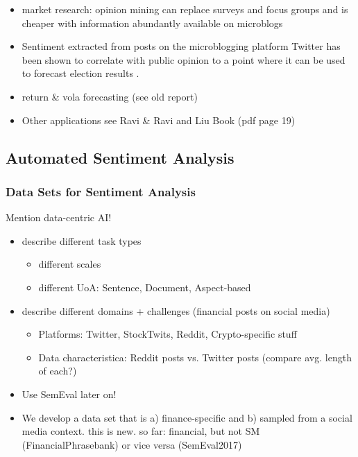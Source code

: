 \begin{itemize}[noitemsep]
	\item market research: opinion mining can replace surveys and focus groups and is cheaper with information abundantly available on microblogs
	\item Sentiment extracted from posts on the microblogging platform Twitter has been shown to correlate with public opinion to a point where it can be used to forecast election results .
	\item return \& vola forecasting (see old report)
	\item Other applications see Ravi \& Ravi and Liu Book (pdf page 19)
\end{itemize}

\subsection{Automated Sentiment Analysis}


\subsubsection{Data Sets for Sentiment Analysis}
Mention data-centric AI!
\begin{itemize}[noitemsep]
	\item describe different task types
	\begin{itemize}
		\item different scales
		\item different UoA: Sentence, Document, Aspect-based
	\end{itemize}
	\item describe different domains + challenges (financial posts on social media)
	\begin{itemize}[noitemsep]
		\item Platforms: Twitter, StockTwits, Reddit, Crypto-specific stuff
		\item Data characteristica: Reddit posts vs. Twitter posts (compare avg. length of each?)
\end{itemize}
	\item Use SemEval later on!
	\item We develop a data set that is a) finance-specific and b) sampled from a social media context. this is new. so far: financial, but not SM (FinancialPhrasebank) or vice versa (SemEval2017)
\end{itemize}

